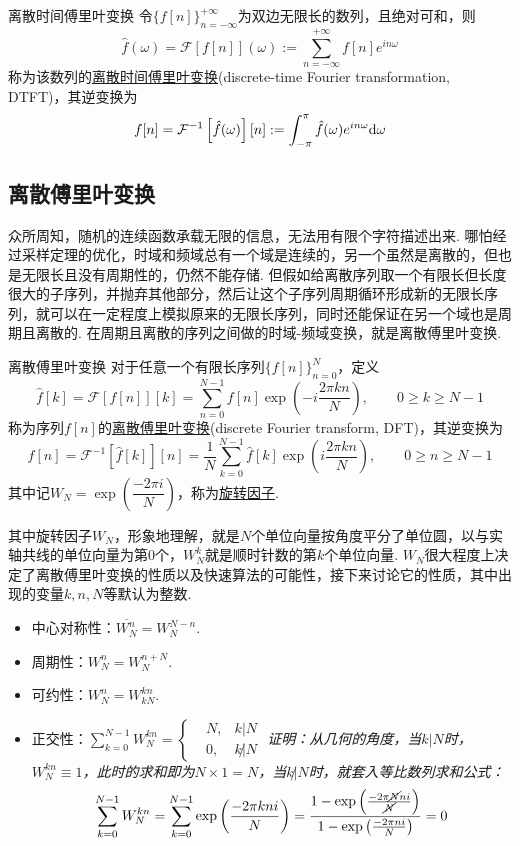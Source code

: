 \begin{definition}{离散时间傅里叶变换}
    令\(\{f[n]\}_{n=-\infty}^{+\infty}\)为双边无限长的数列，且绝对可和，则
    \[\hat{f}(\omega)=\mathcal{F}\left[f[n]\right](\omega):=\sum_{n=-\infty}^{+\infty}f[n]e^{in\omega}\]
    称为该数列的\uline{离散时间傅里叶变换}(discrete-time Fourier transformation, DTFT)，其逆变换为
    \[f[n]=\mathcal{F}^{-1}\left[\hat{f}(\omega)\right][n]:=\int_{-\pi}^{\pi}\hat{f}(\omega)e^{in\omega}{\rm d}\omega\] 
\end{definition}

\subsection{离散傅里叶变换}

众所周知，随机的连续函数承载无限的信息，无法用有限个字符描述出来. 哪怕经过采样定理的优化，时域和频域总有一个域是连续的，另一个虽然是离散的，但也是无限长且没有周期性的，仍然不能存储. 但假如给离散序列取一个有限长但长度很大的子序列，并抛弃其他部分，然后让这个子序列周期循环形成新的无限长序列，就可以在一定程度上模拟原来的无限长序列，同时还能保证在另一个域也是周期且离散的. 在周期且离散的序列之间做的时域-频域变换，就是离散傅里叶变换.

\begin{definition}{离散傅里叶变换}
    对于任意一个有限长序列\(\{f[n]\}_{n=0}^{N}\)，定义
    \[\hat{f}[k]=\mathcal{F}[f[n]][k] = \sum_{n=0}^{N-1}f[n]\exp\left(-i\frac{2\pi kn}{N}\right), \qquad 0 \geq k \geq N-1\]
    称为序列\(f[n]\)的\uline{离散傅里叶变换}(discrete Fourier transform, DFT)，其逆变换为
    \[f[n] = \mathcal{F}^{-1}\left[\hat{f}[k]\right][n] = \frac{1}{N}\sum_{k=0}^{N-1}\hat{f}[k]\exp\left(i\frac{2\pi kn}{N}\right), \qquad 0 \geq n \geq N-1\]
    其中记\(W_{N}=\exp\left(\dfrac{-2\pi i}{N}\right)\)，称为\uline{旋转因子}.
\end{definition}

其中旋转因子\(W_{N}\)，形象地理解，就是\(N\)个单位向量按角度平分了单位圆，以与实轴共线的单位向量为第\(0\)个，\(W_N^k\)就是顺时针数的第\(k\)个单位向量. \(W_N\)很大程度上决定了离散傅里叶变换的性质以及快速算法的可能性，接下来讨论它的性质，其中出现的变量\(k,n,N\)等默认为整数.
\begin{itemize}
    \item [(1)] 中心对称性：\(\overline{W_N^n}=W_N^{N-n}\).
    \item [(2)] 周期性：\(W_N^n=W_N^{n+N}\).
    \item [(3)] 可约性：\(W_N^n=W_{kN}^{kn}\).
    \item [(4)] 正交性：\(\displaystyle{\sum_{k=0}^{N-1}W_N^{kn}=\left\{\begin{aligned} &N,&k|N \\ &0,&k\not | N\end{aligned}\right.}\)
    \newline
    \textit{
        证明：从几何的角度，当\(k|N\)时，\(W_N^{kn}\equiv 1\)，此时的求和即为\(N\times 1=N\)，当\(k\not|N\)时，就套入等比数列求和公式：
        \[\sum_{k=0}^{N-1}W_N^{kn}=\sum_{k=0}^{N-1}\exp\left(\frac{-2\pi kni}{N}\right)=\frac{1-\exp\left(\frac{-2\pi \cancel{N} ni}{\cancel N}\right)}{1-\exp\left(\frac{-2\pi ni}{N}\right)}=0\]
    }
\end{itemize}


